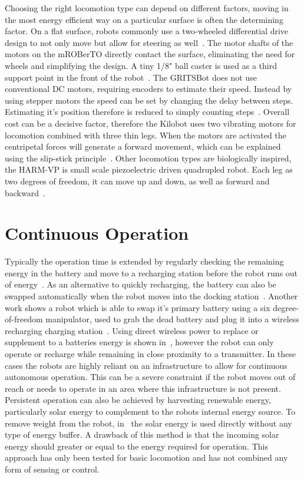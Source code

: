 Choosing the right locomotion type can depend on different factors, moving in the most energy efficient way on a particular surface is often the determining factor.
On a flat surface, robots commonly use a two-wheeled differential drive design to not only move but allow for steering as well~\cite{sabelhaus_icra_2013, pickem_icra_2015}.
The motor shafts of the motors on the mROBerTO directly contact the surface, eliminating the need for wheels and simplifying the design.
A tiny 1/8" ball caster is used as a third support point in the front of the robot~\cite{kim_iros_2016}.
The GRITSBot does not use conventional DC motors, requiring encoders to estimate their speed. 
Instead by using stepper motors the speed can be set by changing the delay between steps. 
Estimating it's position therefore is reduced to simply counting steps~\cite{pickem_icra_2015}.  
Overall cost can be a decisive factor, therefore the Kilobot uses two vibrating motors for locomotion combined with three thin legs.
When the motors are activated the centripetal forces will generate a forward movement, which can be explained using the slip-stick principle~\cite{rubenstein_icra_2012}.
Other locomotion types are biologically inspired, the HARM-VP is small scale piezoelectric driven quadrupled robot.
Each leg as two degrees of freedom, it can move up and down, as well as forward and backward~\cite{baisch_iros_2013}.

\section{Continuous Operation}
\label{sec:continous_operation}

Typically the operation time is extended by regularly checking the remaining energy in the battery and move to a recharging station before the robot runs out of energy~\cite{pickem_icra_2015, rubenstein_icra_2012}.
As an alternative to quickly recharging, the battery can also be swapped automatically when the robot moves into the docking station~\cite{kemal_mech_2015}.
Another work shows a robot which is able to swap it's primary battery using a six degree-of-freedom manipulator, used to grab the dead battery and plug it into a wireless recharging charging station~\cite{zhang_conel_2013}.
Using direct wireless power to replace or supplement to a batteries energy is shown in~\cite{karpelson_icra_2014}, however the robot can only operate or recharge while remaining in close proximity to a transmitter. 
In these cases the robots are highly reliant on an infrastructure to allow for continuous autonomous operation.
This can be a severe constraint if the robot moves out of reach or needs to operate in an area where this infrastructure is not present. 
Persistent operation can also be achieved by harvesting renewable energy, particularly solar energy to complement to the robots internal energy source. 
To remove weight from the robot, in~\cite{bruhwiler_iros_2015} the solar energy is used directly without any type of energy buffer. 
A drawback of this method is that the incoming solar energy should greater or equal to the energy required for operation. 
This approach has only been tested for basic locomotion and has not combined any form of sensing or control.

